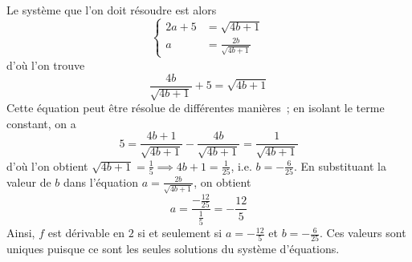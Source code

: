 \begin{exercice}
\medskip
\noindent Le système que l'on doit résoudre est alors
\[
\begin{cases}
2a + 5 & = \sqrt{4b + 1} \\
a & = \frac{2b}{\sqrt{4b + 1}}
\end{cases}
\]
d'où l'on trouve
\[
\frac{4b}{\sqrt{4b + 1}} + 5 = \sqrt{4b + 1}
\]
Cette équation peut être résolue de différentes manières~; en isolant le terme constant, on a
\[
5 = \frac{4b + 1}{\sqrt{4b + 1}} - \frac{4b}{\sqrt{4b + 1}} = \frac{1}{\sqrt{4b + 1}}
\]
d'où l'on obtient $\sqrt{4b + 1} = \frac{1}{5} \implies 4b + 1 = \frac{1}{25}$, i.e. $b = -\frac{6}{25}$. En substituant la valeur de $b$ dans l'équation $a = \frac{2b}{\sqrt{4b + 1}}$, on obtient
\[
a = \frac{-\frac{12}{25}}{\frac{1}{5}} = -\frac{12}{5}
\]
Ainsi, $f$ est dérivable en $2$ si et seulement si $a = -\frac{12}{5}$ et $b = -\frac{6}{25}$. Ces valeurs sont uniques puisque ce sont les seules solutions du système d'équations.
\end{exercice}